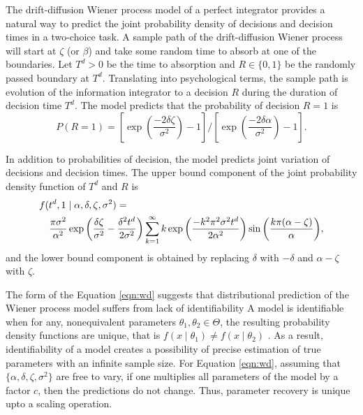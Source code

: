 \documentclass[12pt]{article}
\begin{document}
The drift-diffusion Wiener process model of a perfect integrator provides a natural way to
predict the joint probability density of decisions and decision times in a two-choice task. A sample path of the drift-diffusion
Wiener process will start at $\zeta$ (or $\beta$) and take some random time to
absorb at one of the boundaries. Let $T^d > 0$ be the time to absorption and $R \in \{0,1\}$ be the randomly passed boundary at $T^d$. Translating into psychological terms, the sample path is evolution of the information integrator to a decision $R$ during the duration of decision time $T^d$. The model predicts that the probability of
decision $R = 1$ is
%
\begin{equation}
\label{eqn:prob}
P(R = 1) = \left[\exp\left(\frac{-2\delta \zeta}{\sigma^2}\right)-1\right]/
                \left[\exp\left(\frac{-2\delta \alpha}{\sigma^2}\right)-1\right].
\end{equation}
%

In addition to probabilities of decision, the model predicts joint variation of decisions and decision times. The upper bound component of the joint probability density function of $T^d$ and $R$ is
%
\begin{eqnarray}
\label{eqn:wd}
\lefteqn{f(t^d, 1 \mid \alpha, \delta, \zeta, \sigma^2) =} \nonumber \\
& & \frac{\pi\sigma^2}{\alpha^2}\exp\left(\frac{\delta\zeta}{\sigma^2}-\frac{\delta^2t^d}{2\sigma^2}\right)
\sum_{k=1}^\infty{k\exp\left(\frac{-k^2\pi^2\sigma^2t^d}{2\alpha^2}\right)
\sin\left(\frac{k\pi(\alpha - \zeta)}{\alpha}\right)},
\end{eqnarray}
%
and the lower bound component is obtained by replacing $\delta$ with 
$-\delta$ and $\alpha - \zeta$ with $\zeta$.  

The form of the Equation \ref{eqn:wd}
suggests that distributional prediction of the Wiener process model suffers from lack of identifiability %
A model is identifiable when for any, nonequivalent parameters $\theta_1, \theta_2 \in \Theta$, the resulting probability density functions are unique, that is $f(x \mid \theta_1) \neq f(x \mid \theta_2)$ \citep{CasBer2002}. As a result, identifiability of a  model creates a possibility of precise estimation of true parameters with an infinite sample size. For Equation \ref{eqn:wd},
assuming that $\{\alpha,\delta,\zeta,\sigma^2\}$ are free to vary, if one multiplies all parameters of the model by a factor $c$, then the predictions do not change. Thus, parameter recovery is unique upto a scaling operation. 
\end{document}
